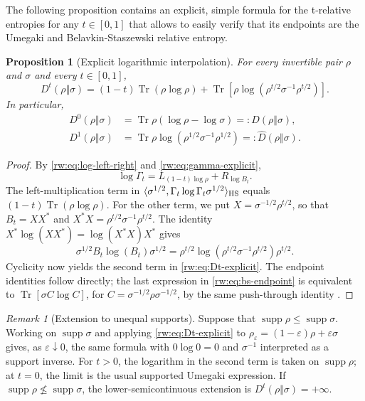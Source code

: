 \documentclass[11pt]{article}
\newtheorem{proposition}[proposition]{Proposition}
\theoremstyle{remark}
\newtheorem{remark}[remark]{Remark}
\newcommand{\1}{\mathbbm{1}}
\begin{document}
The following proposition contains an explicit, simple formula for the t-relative entropies for any $t \in [0,1]$ that allows to easily verify that its endpoints are the Umegaki and Belavkin-Staszewski relative entropy.

\begin{proposition}[Explicit logarithmic interpolation]
\label{rw:prop:Dt-explicit}
For every invertible pair $\rho$ and $\sigma$ and every $t\in[0,1]$,
\begin{equation}
 D^t(\rho\Vert\sigma)
 =(1-t)\operatorname{Tr}(\rho\log\rho)
 +\operatorname{Tr}\!\left[
 \rho\log\!\left(\rho^{t/2}\sigma^{-1}\rho^{t/2}\right)
 \right].
 \label{rw:eq:Dt-explicit}
\end{equation}
In particular,
\begin{align}
 D^0(\rho\Vert\sigma)
 &=\operatorname{Tr}\rho(\log\rho-\log\sigma)
 =:D(\rho\Vert\sigma),
 \label{rw:eq:umegaki-endpoint}\\
 D^1(\rho\Vert\sigma)
 &=\operatorname{Tr}\rho\log(\rho^{1/2}\sigma^{-1}\rho^{1/2})
 =:\widehat D(\rho\Vert\sigma).
 \label{rw:eq:bs-endpoint}
\end{align}
\end{proposition}

\begin{proof}
By \eqref{rw:eq:log-left-right} and
\eqref{rw:eq:gamma-explicit},
\begin{equation}
 \log\Gamma_t
 =L_{(1-t)\log\rho}+R_{\log B_t}.
\end{equation}
The left-multiplication term in
$\langle\sigma^{1/2},\Gamma_t\log\Gamma_t
\sigma^{1/2}\rangle_{\rm HS}$ equals
$(1-t)\operatorname{Tr}(\rho\log\rho)$.  For the other term, we put
$X=\sigma^{-1/2}\rho^{t/2}$, so that
$B_t=XX^*$ and $X^*X=\rho^{t/2}\sigma^{-1}\rho^{t/2}$.  The identity
$X^*\log(XX^*)=\log(X^*X)X^*$ gives
\begin{equation}
 \sigma^{1/2}B_t\log(B_t)\sigma^{1/2}
 =\rho^{t/2}
 \log\!\left(\rho^{t/2}\sigma^{-1}\rho^{t/2}\right)
 \rho^{t/2}.
\end{equation}
Cyclicity now yields the second term in
\eqref{rw:eq:Dt-explicit}.  The endpoint identities follow directly;
the last expression in \eqref{rw:eq:bs-endpoint} is equivalent to
$\operatorname{Tr}[\sigma C\log C]$, for
$C=\sigma^{-1/2}\rho\sigma^{-1/2}$, by the same push-through
identity \cite{fujii1989relative}.
\end{proof}

\begin{remark}[Extension to unequal supports]
Suppose that
$\operatorname{supp}\rho\leq\operatorname{supp}\sigma$.
Working on $\operatorname{supp}\sigma$ and applying
\eqref{rw:eq:Dt-explicit} to
$\rho_\varepsilon=(1-\varepsilon)\rho+\varepsilon\sigma$ gives, as
$\varepsilon\downarrow0$, the same formula with $0\log0=0$ and
$\sigma^{-1}$ interpreted as a support inverse.  For $t>0$, the
logarithm in the second term is taken on
$\operatorname{supp}\rho$; at $t=0$, the limit is the usual supported
Umegaki expression.  If
$\operatorname{supp}\rho\nleq\operatorname{supp}\sigma$, the
lower-semicontinuous extension is $D^t(\rho\Vert\sigma)=+\infty$.
\end{remark}
\end{document}
